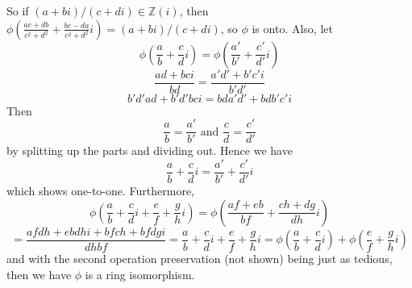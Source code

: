 \documentclass[12pt]{article}
\begin{document}
\begin{enumerate}
\begin{enumerate}
So if $(a + bi)/(c + di) \in \mathbb{Z}(i)$, then 
$\phi(\frac{ac + db}{c^2 + d^2} + \frac{bc - da}{c^2 + d^2}i) = (a + bi)/(c + di)$, so $\phi$ is onto. Also, 
let
\[
\phi(\frac{a}{b} + \frac{c}{d}i) = \phi(\frac{a'}{b'} + \frac{c'}{d'}i)
\]
\[
\frac{ad + bci}{bd} = \frac{a'd' + b'c'i}{b'd'}
\]
\[
b'd'ad + b'd'bci = bda'd' + bdb'c'i
\]
Then
\[
\frac{a}{b} = \frac{a'}{b'} \mbox{ and } \frac{c}{d} = \frac{c'}{d'}
\]
by splitting up the parts and dividing out. Hence we have
\[
\frac{a}{b} + \frac{c}{d}i = \frac{a'}{b'} + \frac{c'}{d'}i
\]
which shows one-to-one. Furthermore,
\[
\phi(\frac{a}{b}+ \frac{c}{d}i + \frac{e}{f} + \frac{g}{h}i) = \phi(\frac{af + eb}{bf} + \frac{ch + dg}{dh}i)
\]
\[
= \frac{afdh + ebdhi + bfch + bfdgi}{dhbf} = \frac{a}{b} + \frac{c}{d}i + \frac{e}{f} + \frac{g}{h}i = 
\phi(\frac{a}{b}+ \frac{c}{d}i) + \phi(\frac{e}{f}+ \frac{g}{h}i)
\]
and with the second operation preservation (not shown) being just as tedious, then we have $\phi$ is a ring isomorphism.
\end{enumerate}


\end{enumerate}
\end{document}

